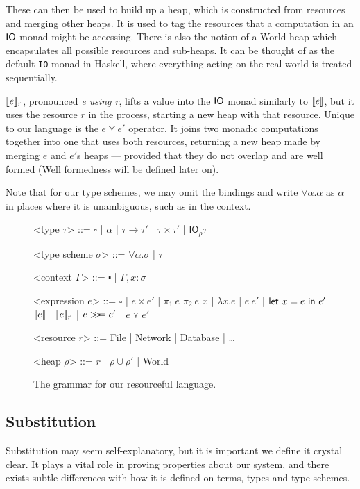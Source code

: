 These can then be used to build up a heap, which is constructed from
resources and merging other heaps. It is used to tag the resources
that a computation in an $\IO$ monad might be accessing. There is also
the notion of a \textsf{World} heap which encapsulates all possible
resources and sub-heaps. It can be thought of as the default
\texttt{IO} monad in Haskell, where everything acting on the real
world is treated sequentially.

$\use{r}{e}$, pronounced \textit{e using r}, lifts a value into the
$\IO$ monad similarly to $\lift{e}$, but it uses the resource $r$ in
the process, starting a new heap with that resource. Unique to our
language is the $e \curlyvee e'$ operator. It joins two monadic computations
together into one that uses both resources, returning a new heap made
by merging $e$ and $e'$s heaps --- provided that they do not overlap and
are well formed (Well formedness will be defined later on).

Note that for our type schemes, we may omit the bindings and write
$\forall \alpha . \alpha$ as $\alpha$ in places where it is unambiguous, such as in the context.

\begin{figure}
\begin{grammar}

  <type $\tau$> ::= $\square$ | $\alpha$ | $\tau \rightarrow \tau'$ | $\tau \times \tau'$ | $\textsf{IO}_\rho \tau$
  
  <type scheme $\sigma$> ::= $\forall \alpha . \sigma$ | $\tau$

  <context $\Gamma$> ::= $\centerdot$ | $\Gamma , x : \sigma$

  <expression $e$> ::= $\square$ | $e \times e'$ | $\pi_1 \ e$ $\pi_2 \ e$
  \alt $x$ | $\lambda x . e$ | $e \ e'$ | $\letin{x = e}{e'}$
  \alt $\lift{e}$ | $\use{r}{e}$ | $e \bind e'$ | $e \curlyvee e'$

  <resource $r$> ::= \textsf{File} | \textsf{Network} |
  \textsf{Database} | \ldots

  <heap $\rho$> ::= $r$ | $\rho \cup \rho'$ | \textsf{World}

\end{grammar}
\caption{The grammar for our resourceful language.}\label{fig:grammar}
\end{figure}

\subsection{Substitution}
Substitution may seem self-explanatory, but it is important we define
it crystal clear. It plays a vital role in proving properties
about our system, and there exists subtle differences with how it is
defined on terms, types and type schemes.

